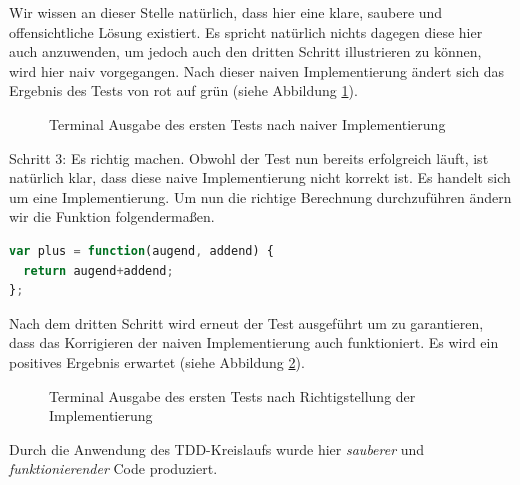 Wir wissen an dieser Stelle natürlich, dass hier eine klare, saubere und offensichtliche Lösung existiert. Es spricht natürlich nichts dagegen diese hier auch anzuwenden, um jedoch auch den dritten Schritt illustrieren zu können, wird hier naiv vorgegangen.\newline
Nach dieser naiven Implementierung ändert sich das Ergebnis des Tests von rot auf grün (siehe Abbildung 
\ref{figure:tdd-simple-step-1-2}).

\begin{figure}[H]
  \centering
  \caption{Terminal Ausgabe des ersten Tests nach naiver Implementierung}
  \label{figure:tdd-simple-step-1-2}
\end{figure}

Schritt 3: Es richtig machen.
Obwohl der Test nun bereits erfolgreich läuft, ist natürlich klar, dass diese naive Implementierung nicht korrekt ist. Es handelt sich um eine  Implementierung. Um nun die richtige Berechnung durchzuführen ändern wir die  Funktion folgendermaßen.

\begin{lstlisting}[language=JavaScript]
var plus = function(augend, addend) {
  return augend+addend;
};
\end{lstlisting}

Nach dem dritten Schritt wird erneut der Test ausgeführt um zu garantieren, dass das Korrigieren der naiven Implementierung auch funktioniert. Es wird ein positives Ergebnis erwartet (siehe Abbildung \ref{figure:tdd-simple-step-1-3}).

\begin{figure}[H]
  \centering
  \caption{Terminal Ausgabe des ersten Tests nach Richtigstellung der Implementierung}
  \label{figure:tdd-simple-step-1-3}
\end{figure}

Durch die Anwendung des TDD-Kreislaufs wurde hier \textit{sauberer} und \textit{funktionierender} Code produziert.

